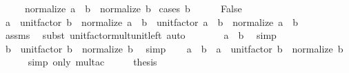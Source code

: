 \begin{isabellebody}
\ \ \ \ \ {\isachardoublequoteopen}normalize\ {\isacharparenleft}{\kern0pt}a\ {\isacharasterisk}{\kern0pt}\ b{\isacharparenright}{\kern0pt}\ {\isacharequal}{\kern0pt}\ normalize\ b{\isachardoublequoteclose}\isanewline
%
\isadelimproof
%
\endisadelimproof
%
\isatagproof
{}\isamarkupfalse%
\ {\isacharparenleft}{\kern0pt}cases\ {\isachardoublequoteopen}b\ {\isacharequal}{\kern0pt}\ {}{\isachardoublequoteclose}{\isacharparenright}{\kern0pt}\isanewline
\ \ \isamarkupfalse%
\ False\isanewline
\ \ \isamarkupfalse%
\ {\isachardoublequoteopen}a\ {\isacharasterisk}{\kern0pt}\ unit{\isacharunderscore}{\kern0pt}factor\ b\ {\isacharasterisk}{\kern0pt}\ normalize\ {\isacharparenleft}{\kern0pt}a\ {\isacharasterisk}{\kern0pt}\ b{\isacharparenright}{\kern0pt}\ {\isacharequal}{\kern0pt}\ unit{\isacharunderscore}{\kern0pt}factor\ {\isacharparenleft}{\kern0pt}a\ {\isacharasterisk}{\kern0pt}\ b{\isacharparenright}{\kern0pt}\ {\isacharasterisk}{\kern0pt}\ normalize\ {\isacharparenleft}{\kern0pt}a\ {\isacharasterisk}{\kern0pt}\ b{\isacharparenright}{\kern0pt}{\isachardoublequoteclose}\isanewline
\ \ \ \ \isamarkupfalse%
\ assms\ \isamarkupfalse%
\ {\isacharparenleft}{\kern0pt}subst\ unit{\isacharunderscore}{\kern0pt}factor{\isacharunderscore}{\kern0pt}mult{\isacharunderscore}{\kern0pt}unit{\isacharunderscore}{\kern0pt}left{\isacharparenright}{\kern0pt}\ auto\isanewline
\ \ \isamarkupfalse%
\ \isamarkupfalse%
\ {\isachardoublequoteopen}{\isasymdots}\ {\isacharequal}{\kern0pt}\ a\ {\isacharasterisk}{\kern0pt}\ b{\isachardoublequoteclose}\ \isamarkupfalse%
\ simp\isanewline
\ \ \isamarkupfalse%
\ \isamarkupfalse%
\ {\isachardoublequoteopen}b\ {\isacharequal}{\kern0pt}\ unit{\isacharunderscore}{\kern0pt}factor\ b\ {\isacharasterisk}{\kern0pt}\ normalize\ b{\isachardoublequoteclose}\ \isamarkupfalse%
\ simp\isanewline
\ \ \isamarkupfalse%
\ {\isachardoublequoteopen}a\ {\isacharasterisk}{\kern0pt}\ b\ {\isacharequal}{\kern0pt}\ a\ {\isacharasterisk}{\kern0pt}\ unit{\isacharunderscore}{\kern0pt}factor\ b\ {\isacharasterisk}{\kern0pt}\ normalize\ b{\isachardoublequoteclose}\isanewline
\ \ \ \ \isamarkupfalse%
\ {\isacharparenleft}{\kern0pt}simp\ only{\isacharcolon}{\kern0pt}\ mult{\isacharunderscore}{\kern0pt}ac{\isacharparenright}{\kern0pt}\isanewline
\ \ \isamarkupfalse%
\ \isamarkupfalse%
\ {\isacharquery}{\kern0pt}thesis\isanewline

\end{isabellebody}
